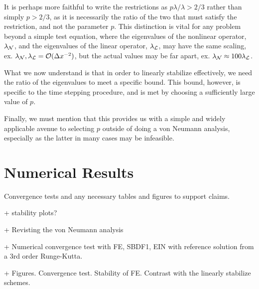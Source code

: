 \begin{remark}
	It is perhaps more faithful to write the restrictions as $p\lambda / \lambda > 2/3$ rather than simply $p > 2/3$, as it is necessarily the ratio of the two that must satisfy the restriction, and not the parameter $p$. This distinction is vital for any problem beyond a simple test equation, where the eigenvalues of the nonlinear operator, $\lambda_{\mathcal{N}}$, and the eigenvalues of the linear operator, $\lambda_{\mathcal{L}}$, may have the same scaling, ex. $\lambda_{\mathcal{N}}, \lambda_{\mathcal{L}} = \mathcal{O}(\Delta x^{-2})$, but the actual values may be far apart, ex. $\lambda_{\mathcal{N}} \approx 100 \lambda_{\mathcal{L}}$.
\end{remark}
\begin{remark}
	What we now understand is that in order to linearly stabilize effectively, we need the ratio of the eigenvalues to meet a specific bound. This bound, however, is specific to the time stepping procedure, and is met by choosing a sufficiently large value of $p$.  
\end{remark}
\begin{remark}
	Finally, we must mention that this provides us with a simple and widely applicable avenue to selecting $p$ outside of doing a von Neumann analysis, especially as the latter in many cases may be infeasible. 
\end{remark}

\section{Numerical Results}
Convergence tests and any necessary tables and figures to support claims.

+ stability plots?

+ Revisting the von Neumann analysis

+ Numerical convergence test with FE, SBDF1, EIN with reference solution from a 3rd order Runge-Kutta.

+ Figures. Convergence test. Stability of FE. Contrast with the linearly stabilize schemes.